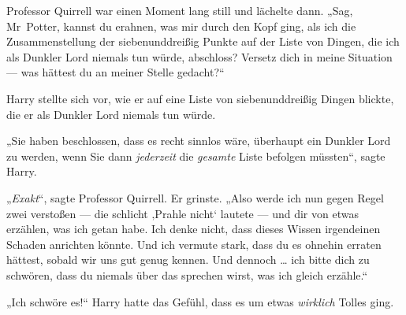 Professor Quirrell war einen Moment lang still und lächelte dann.
„Sag, Mr~Potter, kannst du erahnen, was mir durch den Kopf ging, als ich die Zusammenstellung der siebenunddreißig Punkte auf der Liste von Dingen, die ich als Dunkler Lord niemals tun würde, abschloss? Versetz dich in meine Situation — was hättest du an meiner Stelle gedacht?“

Harry stellte sich vor, wie er auf eine Liste von siebenunddreißig Dingen blickte, die er als Dunkler Lord niemals tun würde.

„Sie haben beschlossen, dass es recht sinnlos wäre, überhaupt ein Dunkler Lord zu werden, wenn Sie dann \emph{jederzeit} die \emph{gesamte} Liste befolgen müssten“, sagte Harry.

„\emph{Exakt}“, sagte Professor Quirrell. Er grinste.
„Also werde ich nun gegen Regel zwei verstoßen — die schlicht ‚Prahle nicht‘ lautete — und dir von etwas erzählen, was ich getan habe. Ich denke nicht, dass dieses Wissen irgendeinen Schaden anrichten könnte. Und ich vermute stark, dass du es ohnehin erraten hättest, sobald wir uns gut genug kennen. Und dennoch … ich bitte dich zu schwören, dass du niemals über das sprechen wirst, was ich gleich erzähle.“

„Ich schwöre es!“ Harry hatte das Gefühl, dass es um etwas \emph{wirklich} Tolles ging.

